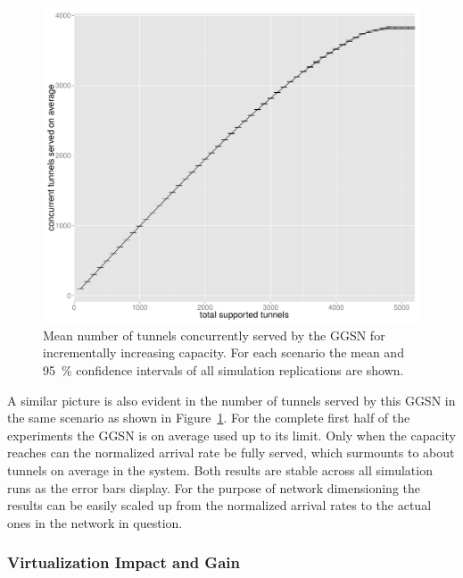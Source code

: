 \begin{figure}[htb]
  \centering
  \includegraphics[width=1.0\textwidth]{images/R-monolithic-tunnelusage.pdf}
  \caption{Mean number of tunnels concurrently served by the \gls{GGSN} for incrementally increasing capacity. For each scenario the mean and \SI{95}{\percent} confidence intervals of all simulation replications are shown.}
\label{c4:fig:traditional_tunnelusage}
\end{figure}

A similar picture is also evident in the number of tunnels served by this \gls{GGSN} in the same scenario as shown in Figure~\ref{c4:fig:traditional_tunnelusage}. For the complete first half of the experiments the \gls{GGSN} is on average used up to its limit. Only when the capacity reaches  can the normalized arrival rate be fully served, which surmounts to about  tunnels on average in the system. Both results are stable across all simulation runs as the error bars display. For the purpose of network dimensioning the results can be easily scaled up from the normalized arrival rates to the actual ones in the network in question.



\subsubsection{Virtualization Impact and Gain}

